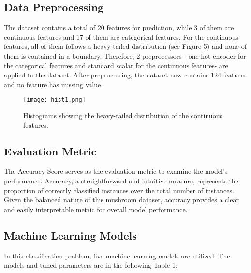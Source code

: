 \documentclass{article}
\begin{document}
\subsection{Data Preprocessing}
\hspace{0.5cm} The dataset contains a total of 20 features for prediction, while 3 of them are continuous features and 17 of them are categorical features. For the continuous features, all of them follows a heavy-tailed distribution (see Figure 5) and none of them is contained in a boundary. Therefore, 2 preprocessors - one-hot encoder for the categorical features and standard scalar for the continuous features- are applied to the dataset. After preprocessing, the dataset now contains 124 features and no feature has missing value.

\begin{figure}[h]
\centering
\texttt{[image: hist1.png]}
\caption{\label{fig:frog} Histograms showing the heavy-tailed distribution of the continuous features.}
\end{figure}

\subsection{Evaluation Metric}
\hspace{0.5cm} The Accuracy Score serves as the evaluation metric to examine the model's performance. Accuracy, a straightforward and intuitive measure, represents the proportion of correctly classified instances over the total number of instances. Given the balanced nature of this mushroom dataset, accuracy provides a clear and easily interpretable metric for overall model performance.  

\subsection{Machine Learning Models}
\hspace{0.5cm} In this classification problem, five machine learning models are utilized. The models and tuned parameters are in the following Table 1:
\end{document}
